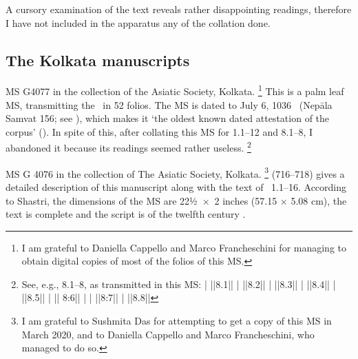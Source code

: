 A cursory examination of the text reveals rather disappointing 
readings, therefore I have not included  in the apparatus
any of the collation done.

\medskip
\subsection{The Kolkata manuscripts}






MS G4077 in the collection of the Asiatic Society, Kolkata.%
	\footnote{I am grateful to Daniella Cappello and Marco Francheschini
                  for managing to obtain digital copies of most of the folios of this MS.}
This is a palm leaf MS, transmitting the \VSS\ in 52 folios.
The MS is dated to July 6, 1036 \CE\ (Nepāla Samvat 156; 
see ), which makes
it `the oldest known dated attestation of the corpus'
().
In spite of this, after collating this MS for 1.1--12 and 8.1--8,
I abandoned it because its readings seemed rather useless.%
        \footnote{See, e.g., 8.1--8, as transmitted in this MS:
         |
         ||8.1||
         |
         ||8.2||
         |
         ||8.3||
         |
         ||8.4||
         |
         ||8.5||
         |
         || 8:6||
         |
         |
         ||8:7||
         |
         ||8.8||}

MS G 4076 in the collection of The Asiatic Society, Kolkata.%
	\footnote{I am grateful to Sushmita Das for attempting to 
			get a copy of this MS in March 2020,
                        and to Daniella Cappello and Marco Francheschini, who
                        managed to do so.}
 (716--718) gives a 
detailed description of this manuscript along with the text
of \VSS\ 1.1--16. According to Shastri, the dimensions of the MS are
22½~×~2 inches (57.15 × 5.08 cm), the text is complete and
the script is of the twelfth century \CE. 

